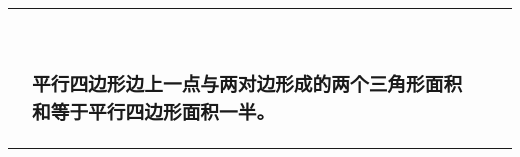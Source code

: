 \begin{longtable}[]{@{}llll@{}}
\toprule
\endhead
\begin{minipage}[t]{0.22\columnwidth}\raggedright
\hypertarget{section-1}{%
\subsubsection{}\label{section-1}}\strut
\end{minipage} & \begin{minipage}[t]{0.22\columnwidth}\raggedright
\hypertarget{section-2}{%
\subsubsection{}\label{section-2}}\strut
\end{minipage} & \begin{minipage}[t]{0.22\columnwidth}\raggedright
\hypertarget{section-3}{%
\subsubsection{}\label{section-3}}\strut
\end{minipage} & \begin{minipage}[t]{0.22\columnwidth}\raggedright
\hypertarget{section-4}{%
\subsubsection{}\label{section-4}}\strut
\end{minipage}\tabularnewline
\begin{minipage}[t]{0.22\columnwidth}\raggedright
\hypertarget{section-5}{%
\subsubsection{}\label{section-5}}

\hypertarget{section-6}{%
\subsubsection{}\label{section-6}}\strut
\end{minipage} & \begin{minipage}[t]{0.22\columnwidth}\raggedright
\hypertarget{ux5e73ux884cux56dbux8fb9ux5f62ux8fb9ux4e0aux4e00ux70b9ux4e0eux4e24ux5bf9ux8fb9ux5f62ux6210ux7684ux4e24ux4e2aux4e09ux89d2ux5f62ux9762ux79efux548cux7b49ux4e8eux5e73ux884cux56dbux8fb9ux5f62ux9762ux79efux4e00ux534a}{%
\subsubsection{平行四边形边上一点与两对边形成的两个三角形面积和等于平行四边形面积一半。}\label{ux5e73ux884cux56dbux8fb9ux5f62ux8fb9ux4e0aux4e00ux70b9ux4e0eux4e24ux5bf9ux8fb9ux5f62ux6210ux7684ux4e24ux4e2aux4e09ux89d2ux5f62ux9762ux79efux548cux7b49ux4e8eux5e73ux884cux56dbux8fb9ux5f62ux9762ux79efux4e00ux534a}}\strut
\end{minipage} & \begin{minipage}[t]{0.22\columnwidth}\raggedright
\hypertarget{section-7}{%
}
\end{minipage}
\end{longtable}
